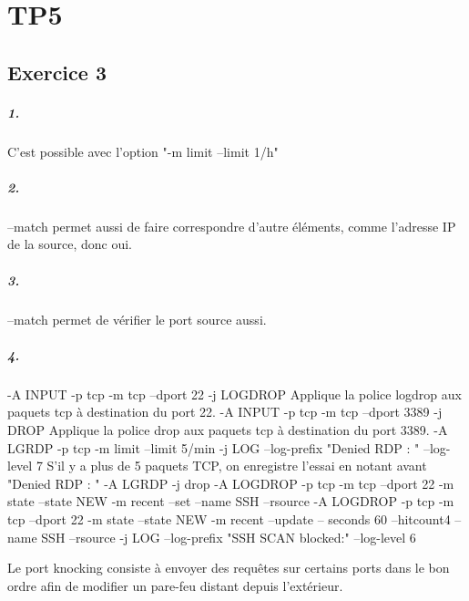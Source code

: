 \chapter{TP5}
    \section{Exercice 3}
        \paragraph{1.}
            C'est possible avec l'option "-m limit --limit 1/h"
        \paragraph{2.}
            --match permet aussi de faire correspondre d'autre éléments, comme l'adresse IP de la source, donc oui.
        \paragraph{3.}
            --match permet de vérifier le port source aussi.
        \paragraph{4.}
            -A INPUT -p tcp -m tcp --dport 22 -j LOGDROP
            Applique la police logdrop aux paquets tcp à destination du port 22.
            -A INPUT -p tcp -m tcp --dport 3389 -j DROP
            Applique la police drop aux paquets tcp à destination du port 3389.
            -A LGRDP -p tcp -m limit --limit 5/min -j LOG --log-prefix "Denied RDP : " --log-level 7
            S'il y a plus de 5 paquets TCP, on enregistre l'essai en notant avant "Denied RDP : "
            -A LGRDP -j drop
            -A LOGDROP -p tcp -m tcp --dport 22 -m state --state NEW -m recent --set --name SSH --rsource
            -A LOGDROP -p tcp -m tcp --dport 22 -m state --state NEW -m recent --update -- seconds 60 --hitcount4 --name SSH --rsource -j LOG --log-prefix "SSH SCAN blocked:" --log-level 6

            Le port knocking consiste à envoyer des requêtes sur certains ports dans le bon ordre afin de modifier un pare-feu distant depuis l'extérieur.
